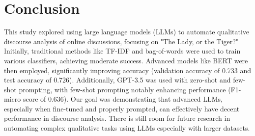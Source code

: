 \documentclass[fleqn,moreauthors,10pt]{ds_report}
\begin{document}
\section*{Conclusion}


This study explored using large language models (LLMs) to automate qualitative discourse analysis of online discussions, focusing on "The Lady, or the Tiger?" Initially, traditional methods like TF-IDF and bag-of-words were used to train various classifiers, achieving moderate success. Advanced models like BERT were then employed, significantly improving accuracy (validation accuracy of 0.733 and test accuracy of 0.726). Additionally, GPT-3.5 was used with zero-shot and few-shot prompting, with few-shot prompting notably enhancing performance (F1-micro score of 0.636). Our goal was demonstrating that advanced LLMs, especially when fine-tuned and properly prompted, can effectively have decent performance in discourse analysis. There is still room for future research in automating complex qualitative tasks using LLMs especially with larger datasets.





\end{document}
